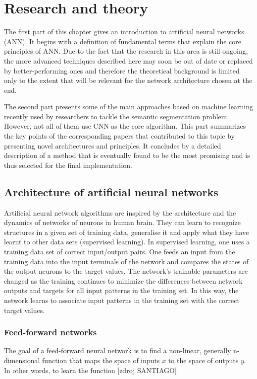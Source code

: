 \chapter{Research and theory}
\label{research}
The first part of this chapter gives an introduction to artificial neural networks (ANN). It begins with a definition of fundamental terms that explain the core principles of ANN. Due to the fact that the research in this area is still ongoing, the more advanced techniques described here may soon be out of date or replaced by better-performing ones and therefore the theoretical background is limited only to the extent that will be relevant for the network architecture chosen at the end.

The second part presents some of the main approaches based on machine learning recently used by researchers to tackle the semantic segmentation problem. However, not all of them use CNN as the core algorithm. This part summarizes the key points of the corresponding papers that contributed to this topic by presenting novel architectures and principles. It concludes by a detailed description of a method that is eventually found to be the most promising and is thus selected for the final implementation.

\section{Architecture of artificial neural networks}
Artificial neural network algorithms are inspired by the architecture and the dynamics
of networks of neurons in human brain. They can learn to recognize structures in a given set of training data, generalise it and apply what they have learnt to other data sets (supervised learning). In supervised learning, one uses a training data set of correct input/output pairs. One feeds an input from the training data into the input terminals of the network and compares the states of the output neurons to the target values. The network's trainable parameters are changed as the training continues to minimize the differences between network outputs and targets for all input patterns in the training set. In this way, the network learns to associate input patterns in the training set with the correct target values. 

\subsection{Feed-forward networks}

The goal of a feed-forward neural network is to find a non-linear, generally n-dimensional function that maps the space of inputs $ x $ to the space of outputs $ y $. In other words, to learn the function [zdroj SANTIAGO]

